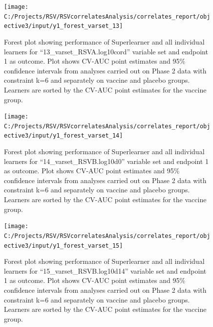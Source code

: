 \documentclass[11pt]{article}
\begin{document}
\begin{figure}[H]

{\centering \texttt{[image: C:/Projects/RSV/RSVcorrelatesAnalysis/correlates\_report/objective3/input/y1\_forest\_varset\_13]} 

}

\caption[Forest plot for ``13\_varset\_RSVA.log10cord'' variable set, endpoint 1.]{Forest plot showing performance of Superlearner and all individual learners for ``13\_varset\_RSVA.log10cord'' variable set and endpoint 1 as outcome. Plot shows CV-AUC point estimates and 95\% confidence intervals from analyses carried out on Phase 2 data with constraint k=6 and separately on vaccine and placebo groups. Learners are sorted by the CV-AUC point estimates for the vaccine group.}\label{fig:y1-forest-varset-13}
\end{figure}

\begin{figure}[H]

{\centering \texttt{[image: C:/Projects/RSV/RSVcorrelatesAnalysis/correlates\_report/objective3/input/y1\_forest\_varset\_14]} 

}

\caption[Forest plot for ``14\_varset\_RSVB.log10d0'' variable set, endpoint 1.]{Forest plot showing performance of Superlearner and all individual learners for ``14\_varset\_RSVB.log10d0'' variable set and endpoint 1 as outcome. Plot shows CV-AUC point estimates and 95\% confidence intervals from analyses carried out on Phase 2 data with constraint k=6 and separately on vaccine and placebo groups. Learners are sorted by the CV-AUC point estimates for the vaccine group.}\label{fig:y1-forest-varset-14}
\end{figure}

\begin{figure}[H]

{\centering \texttt{[image: C:/Projects/RSV/RSVcorrelatesAnalysis/correlates\_report/objective3/input/y1\_forest\_varset\_15]} 

}

\caption[Forest plot for ``15\_varset\_RSVB.log10d14'' variable set, endpoint 1.]{Forest plot showing performance of Superlearner and all individual learners for ``15\_varset\_RSVB.log10d14'' variable set and endpoint 1 as outcome. Plot shows CV-AUC point estimates and 95\% confidence intervals from analyses carried out on Phase 2 data with constraint k=6 and separately on vaccine and placebo groups. Learners are sorted by the CV-AUC point estimates for the vaccine group.}\label{fig:y1-forest-varset-15}
\end{figure}
\end{document}
